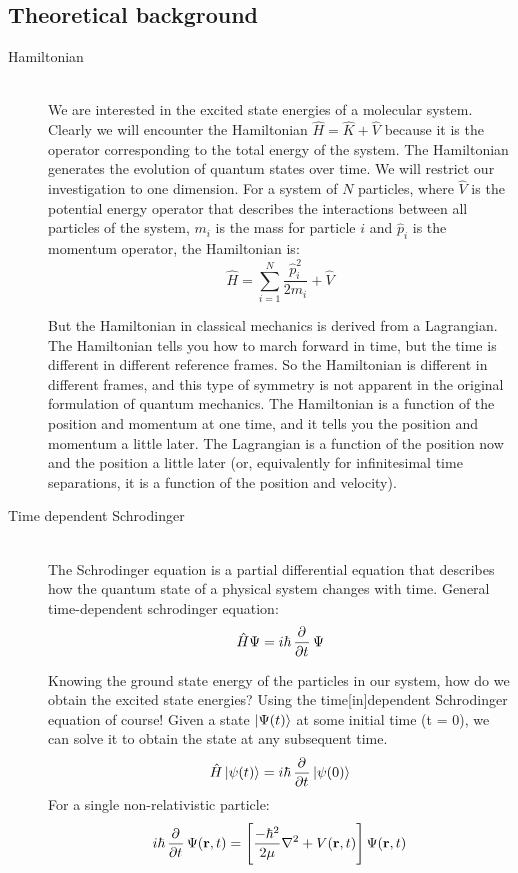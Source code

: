 \documentclass[12pt,letterpaper,oneside,final,titlepage]{article}               %
\numberwithin{equation}{section} %
\renewcommand{\vec}[1]{\mathbf{#1}}
\begin{document}
\newpage

\subsection{Theoretical background}
\begin{description}
    \item[Hamiltonian] \hfill \\
    We are interested in the excited state energies of a molecular system. 
    Clearly we will encounter the Hamiltonian $\hat{H} = \hat{K} + \hat{V}$ because it is the operator corresponding to the total energy of the system.
    The Hamiltonian generates the evolution of quantum states over time. 
    We will restrict our investigation to one dimension. 
    For a system of $N$ particles, where $\hat{V}$ is the potential energy operator that describes the interactions between 
    all particles of the system, $m_{i}$ is the mass for particle $i$ and $\hat{p}_{i}$ is the momentum operator, the Hamiltonian is:
    \begin{equation}
        \hat{H} = \sum_{i=1}^{N}\frac{\hat{p}_{i}^2}{2m_{i}} + \hat{V}
    \end{equation}

    But the Hamiltonian in classical mechanics is derived from a Lagrangian. 
    The Hamiltonian tells you how to march forward in time, but the time is different in different reference frames. 
    So the Hamiltonian is different in different frames, and this type of symmetry is not apparent in the original formulation of quantum mechanics.
    The Hamiltonian is a function of the position and momentum at one time, and it tells you the position and momentum a little later. 
    The Lagrangian is a function of the position now and the position a little later (or, equivalently for infinitesimal time separations, it is a function of the position and velocity). 



    \item[Time dependent Schrodinger] \hfill \\
    The Schrodinger equation is a partial differential equation that describes how the quantum state of a physical system changes with time. General time-dependent schrodinger equation:
    \begin{equation}
        \hat{H}\Psi = i\hbar\dpd{}{t}\Psi
    \end{equation}


    Knowing the ground state energy of the particles in our system, how do we obtain the excited state energies? 
    Using the time[in]dependent Schrodinger equation of course! 
    Given a state $\ket{\Psi(t)}$ at some initial time (t = 0), we can solve it to obtain the state at any subsequent time.
    \begin{equation}
        \hat{H}\ket{\psi(t)} = i\hbar\dpd{}{t}\ket{\psi(0)}  
    \end{equation}
    For a single non-relativistic particle:
    \begin{equation}
        i\hbar\dpd{}{t}\Psi(\vec{r},t) = \left[\frac{-\hbar^{2}}{2\mu}\nabla^{2} + V(\vec{r},t)\right]\Psi(\vec{r},t)
    \end{equation}


\end{description}
\end{document}
